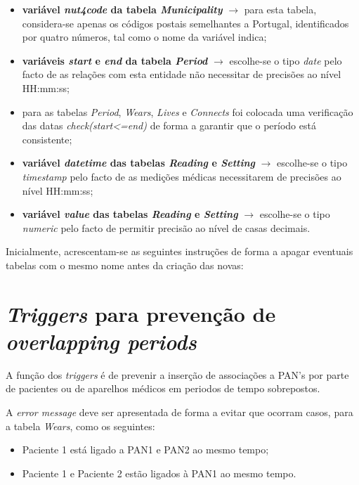 \documentclass[a4paper]{article}
\begin{document}
\begin{itemize}
  \item \textbf{variável \textit{nut4code} da tabela \textit{Municipality}} $\rightarrow$ para esta tabela, considera-se apenas os códigos postais semelhantes a Portugal, identificados por quatro números, tal como o nome da variável indica;
  
  \item \textbf{variáveis \textit{start} e \textit{end} da tabela \textit{Period}} $\rightarrow$ escolhe-se o tipo \textit{date} pelo facto de as relações com esta entidade não necessitar de precisões ao nível HH:mm:ss;
  
  \item para as tabelas \textit{Period}, \textit{Wears}, \textit{Lives} e \textit{Connects} foi colocada uma verificação das datas \textit{check(start<=end)} de forma a garantir que o período está consistente;

  \item \textbf{variável \textit{datetime} das tabelas \textit{Reading} e \textit{Setting}} $\rightarrow$ escolhe-se o tipo \textit{timestamp} pelo facto de as medições médicas necessitarem de precisões ao nível HH:mm:ss;
  
  \item \textbf{variável \textit{value} das tabelas \textit{Reading} e \textit{Setting}} $\rightarrow$ escolhe-se o tipo \textit{numeric} pelo facto de permitir precisão ao nível de casas decimais.  
\end{itemize}
\pagebreak
Inicialmente, acrescentam-se as seguintes instruções de forma a apagar eventuais tabelas com o mesmo nome antes da criação das novas:



\section{\textit{Triggers} para prevenção de \textit{overlapping periods}}
A função dos \textit{triggers} é de prevenir a inserção de associações a PAN's por parte de pacientes ou de aparelhos médicos em periodos de tempo sobrepostos. 

A \textit{error message} deve ser apresentada de forma a evitar que ocorram casos,  para a tabela \textit{Wears}, como os seguintes:
\vskip 5mm
\begin{itemize}
\item Paciente 1 está ligado a PAN1 e PAN2 ao mesmo tempo;

\item  Paciente 1 e Paciente 2 estão ligados à PAN1 ao mesmo tempo.
\end{itemize}
\end{document}
